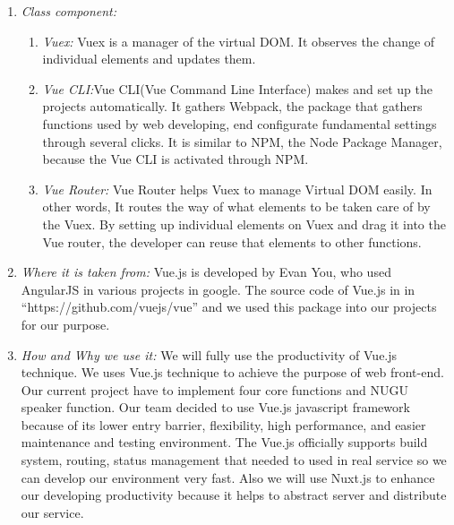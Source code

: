 \documentclass[conference]{IEEEtran}
\begin{document}
\begin{enumerate}
  \item \textit{Class component: }
    \begin{enumerate}
\item \textit {Vuex: }  Vuex is a manager of the virtual DOM. It observes the change of individual elements and updates them.\\
\item \textit {Vue CLI:}Vue CLI(Vue Command Line Interface) makes and set up the projects automatically. It gathers Webpack, the package that gathers functions used by web developing, end configurate fundamental settings through several clicks. It is similar to NPM, the Node Package Manager, because the Vue CLI is activated through NPM.\\
\item \textit {Vue Router:} Vue Router helps Vuex to manage Virtual DOM easily. In other words, It routes the way of what elements to be taken care of by the Vuex. By setting up individual elements on Vuex and drag it into the Vue router, the developer can reuse that elements to other functions.\\
\end{enumerate}
  \item \textit{Where it is taken from: } Vue.js is developed by Evan You, who used AngularJS in various projects in google. The source code of Vue.js in in “https://github.com/vuejs/vue” and we used this package into our projects for our purpose.\\
  \item \textit{How and Why we use it: } We will fully use the productivity of Vue.js technique. We uses Vue.js technique to achieve the purpose of web front-end. Our current project have to implement four core functions and NUGU speaker function. Our team decided to use Vue.js javascript framework because of its lower entry barrier, flexibility, high performance, and easier maintenance and testing environment. The Vue.js officially supports build system, routing, status management that needed to used in real service so we can develop our environment very fast. Also we will use Nuxt.js to enhance our developing productivity because it helps to abstract server and distribute our service.\\
  \end{enumerate}
\end{document}
